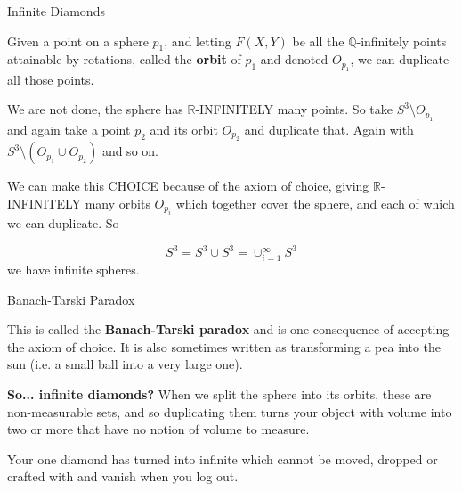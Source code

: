 \documentclass[9pt]{beamer}
\begin{document}
\begin{frame}{Infinite Diamonds}

        Given a point on a sphere $p_1$, and letting $F(X, Y)$ be all the $\mathbb{Q}$-infinitely points attainable by rotations, called the \textbf{orbit} of $p_1$ and denoted $O_{p_1}$, we can duplicate all those points.
        
        \pause

        \vspace{24pt}
        
        We are not done, the sphere has $\mathbb{R}$-INFINITELY many points.
        So take $S^3\setminus O_{p_1}$ and again take a point $p_2$ and its orbit $O_{p_2}$ and duplicate that.
        Again with $S^3\setminus (O_{p_1}\cup O_{p_2})$ and so on.

        \pause

        \vspace{24pt}
        
        We can make this CHOICE because of the axiom of choice, giving $\mathbb{R}$-INFINITELY many orbits $O_{p_i}$ which together cover the sphere, and each of which we can duplicate. \pause
        So

        \[S^3=S^3\cup S^3=\cup_{i=1}^\infty S^3\]
        we have infinite spheres.
        
    \end{frame}

    \begin{frame}{Banach-Tarski Paradox}

        This is called the \textbf{Banach-Tarski paradox} and is one consequence of accepting the axiom of choice.
        It is also sometimes written as transforming a pea into the sun (i.e. a small ball into a very large one).

        \pause

        \vspace{24pt}

        \textbf{So... infinite diamonds?} \pause
        When we split the sphere into its orbits, these are non-measurable sets, and so duplicating them turns your object with volume into two or more that have no notion of volume to measure.
        
        \pause

        \vspace{24pt}
        
        Your one diamond has turned into infinite which cannot be moved, dropped or crafted with and vanish when you log out.
        
    \end{frame}
\end{document}
